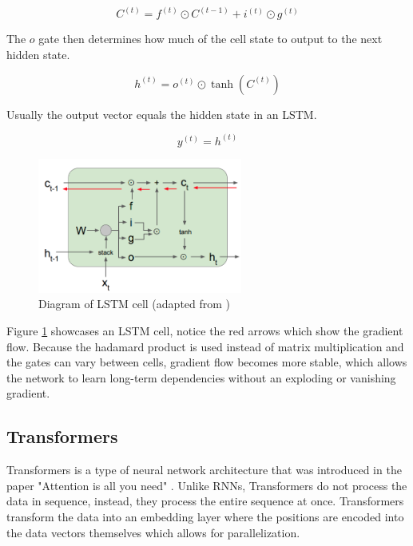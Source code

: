 \documentclass[11pt]{article}
\begin{document}
\begin{equation} C^{(t)} = f^{(t)} \odot C^{(t-1)} + i^{(t)} \odot g^{(t)} \end{equation}

The $o$ gate then determines how much of the cell state to output to the next hidden state.

\begin{equation} h^{(t)} = o^{(t)} \odot \tanh(C^{(t)}) \end{equation}

Usually the output vector equals the hidden state in an LSTM.

\begin{equation} y^{(t)} = h^{(t)} \end{equation}

\begin{figure}[h]
\centering
\includegraphics[width=0.6\textwidth]{lstm_diagram.png}
\caption{Diagram of LSTM cell (adapted from \cite{StanfordEngineering2020})}
\label{fig:lstm_diagram}
\end{figure}

Figure \ref{fig:lstm_diagram} showcases an LSTM cell, notice the red arrows which show the gradient flow. Because the hadamard product is used instead of matrix multiplication and the gates can vary between cells, gradient flow becomes more stable, which allows the network to learn long-term dependencies without an exploding or vanishing gradient.
\subsection{Transformers}

Transformers is a type of neural network architecture that was introduced in the paper "Attention is all you need" \cite{DBLP:journals/corr/VaswaniSPUJGKP17}. Unlike RNNs, Transformers do not process the data in sequence, instead, they process the entire sequence at once. Transformers transform the data into an embedding layer where the positions are encoded into the data vectors themselves which allows for parallelization.
\end{document}
